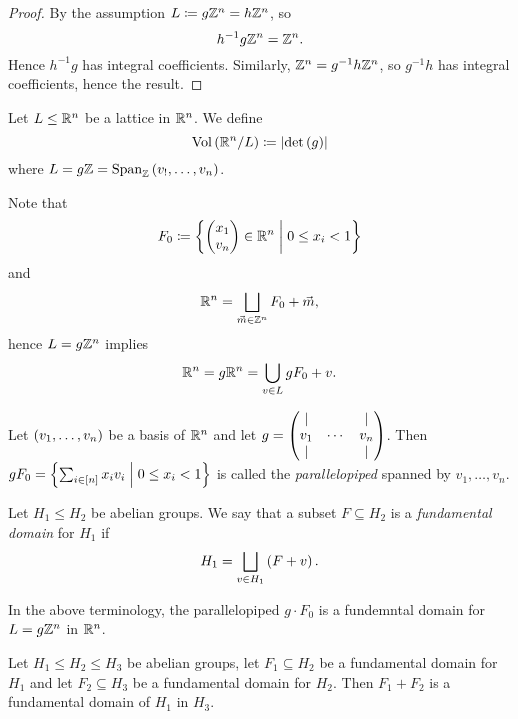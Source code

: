 \documentclass[11pt]{article}
\begin{document}
\begin{proof}
By the assumption $L \coloneqq g \mathbb{Z}^n = h \mathbb{Z}^n$, so
\[h^{-1} g \mathbb{Z}^n = \mathbb{Z}^n \text{.}\]
Hence $h^{-1} g$ has integral coefficients.
Similarly,
$\mathbb{Z}^n = g^{-1} h \mathbb{Z}^n$, so $g^{-1} h$ has integral coefficients, hence the result.
\end{proof}

\begin{definition}
Let $L \leq \mathbb{R}^n$ be a lattice in $\mathbb{R}^n$. We define
\[\mathrm{Vol}\left( \mathbb{R}^n / L \right) \coloneqq \left| \det\left( g \right) \right|\]
where $L = g \mathbb{Z} = \operatorname{Span}_{\mathbb{Z}}\left( v_!, \ldots, v_n \right)$.
\end{definition}

\begin{remark}
Note that
\[F_0 \coloneqq \set{\pmat{x_1 \\ v_n} \in \mbb{R}^n}{0 \leq x_i < 1}\]
and
\[\mathbb{R}^n = \bigsqcup_{\vec{m} \in \mathbb{Z}^n} F_0 + \vec{m} \text{,}\]
hence $L = g \mathbb{Z}^n$
implies
\[\mathbb{R}^n = g\mathbb{R}^n = \bigcup_{v \in L} g F_0 + v \text{.}\]
\end{remark}

\begin{definition}
Let $\left( v_1, \ldots, v_n \right)$ be a basis of $\mathbb{R}^n$ and let $g = \begin{pmatrix}\vert & & \vert \\ v_1 & \cdots & v_n \\ \vert & & \vert\end{pmatrix}$.
Then $g F_0 = \set{\sum_{i \in \brs{n}} x_i v_i}{0 \leq x_i < 1}$ is called the \emph{parallelopiped} spanned by $v_1, \ldots, v_n$.
\end{definition}

\begin{definition}
Let $H_1 \leq H_2$ be abelian groups. We say that a subset $F \subseteq H_2$ is a \emph{fundamental domain} for $H_1$ if
\[H_1 = \bigsqcup_{v \in H_1} \left( F + v \right) \text{.}\]
\end{definition}

\begin{remark}
In the above terminology, the parallelopiped $g \cdot F_0$ is a fundemntal domain for $L = g \mathbb{Z}^n$ in $\mathbb{R}^n$.
\end{remark}

\begin{proposition}
Let $H_1 \leq H_2 \leq H_3$ be abelian groups, let $F_1 \subseteq  H_2$ be a fundamental domain for $H_1$ and let $F_2 \subseteq H_3$ be a fundamental domain for $H_2$. Then $F_1 + F_2$ is a fundamental domain of $H_1$ in $H_3$.
\end{proposition}
\end{document}
